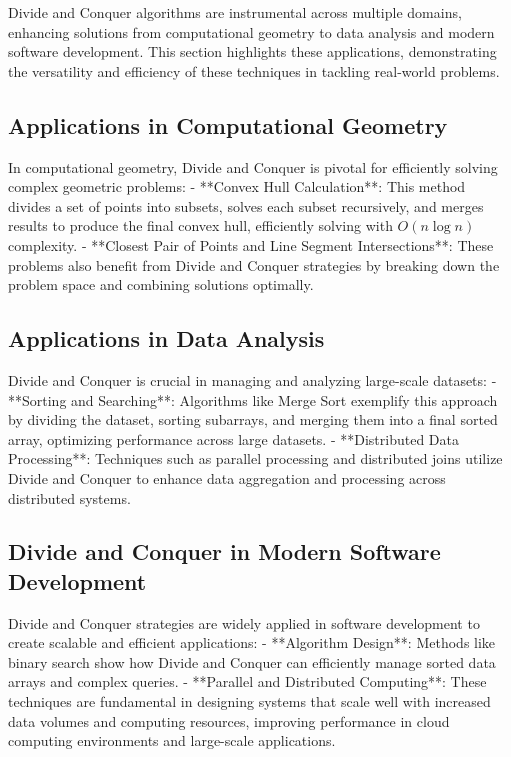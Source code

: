 \documentclass[12pt]{book} %
\begin{document}
Divide and Conquer algorithms are instrumental across multiple domains, enhancing solutions from computational geometry to data analysis and modern software development. This section highlights these applications, demonstrating the versatility and efficiency of these techniques in tackling real-world problems.

\subsection{Applications in Computational Geometry}

In computational geometry, Divide and Conquer is pivotal for efficiently solving complex geometric problems:
- **Convex Hull Calculation**: This method divides a set of points into subsets, solves each subset recursively, and merges results to produce the final convex hull, efficiently solving with \(O(n \log n)\) complexity.
- **Closest Pair of Points and Line Segment Intersections**: These problems also benefit from Divide and Conquer strategies by breaking down the problem space and combining solutions optimally.

\subsection{Applications in Data Analysis}

Divide and Conquer is crucial in managing and analyzing large-scale datasets:
- **Sorting and Searching**: Algorithms like Merge Sort exemplify this approach by dividing the dataset, sorting subarrays, and merging them into a final sorted array, optimizing performance across large datasets.
- **Distributed Data Processing**: Techniques such as parallel processing and distributed joins utilize Divide and Conquer to enhance data aggregation and processing across distributed systems.

\subsection{Divide and Conquer in Modern Software Development}

Divide and Conquer strategies are widely applied in software development to create scalable and efficient applications:
- **Algorithm Design**: Methods like binary search show how Divide and Conquer can efficiently manage sorted data arrays and complex queries.
- **Parallel and Distributed Computing**: These techniques are fundamental in designing systems that scale well with increased data volumes and computing resources, improving performance in cloud computing environments and large-scale applications.
\end{document}
